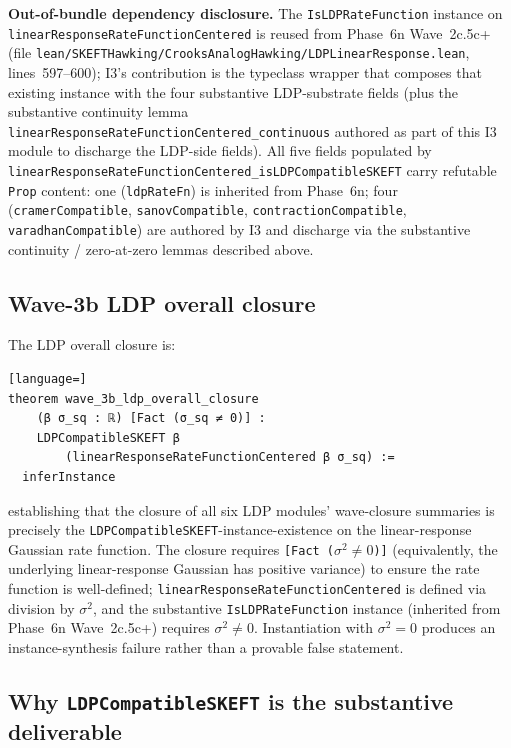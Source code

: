 \documentclass[11pt]{article}
\begin{document}
\textbf{Out-of-bundle dependency disclosure.} The
\texttt{IsLDPRateFunction} instance on
\texttt{linearResponseRateFunctionCentered} is reused from Phase~6n
Wave~2c.5c+ (file
\texttt{lean/SKEFTHawking/CrooksAnalogHawking/LDPLinearResponse.lean}, lines~597--600);
I3's contribution is the typeclass wrapper that composes that
existing instance with the four substantive LDP-substrate fields
(plus the substantive continuity lemma
\texttt{linearResponseRateFunctionCentered\_continuous} authored as
part of this I3 module to discharge the LDP-side fields). All five
fields populated by
\texttt{linearResponseRateFunctionCentered\_isLDPCompatibleSKEFT}
carry refutable \texttt{Prop} content: one (\texttt{ldpRateFn}) is
inherited from Phase~6n; four (\texttt{cramerCompatible},
\texttt{sanovCompatible}, \texttt{contractionCompatible},
\texttt{varadhanCompatible}) are authored by I3 and discharge via
the substantive continuity / zero-at-zero lemmas described above.

\subsection{Wave-3b LDP overall closure}

The LDP overall closure is:
\begin{lstlisting}[language=]
theorem wave_3b_ldp_overall_closure
    (β σ_sq : ℝ) [Fact (σ_sq ≠ 0)] :
    LDPCompatibleSKEFT β
        (linearResponseRateFunctionCentered β σ_sq) :=
  inferInstance
\end{lstlisting}

establishing that the closure of all six LDP modules' wave-closure
summaries is precisely the
\texttt{LDPCompatibleSKEFT}-instance-existence on the linear-response
Gaussian rate function. The closure requires
\texttt{[Fact ($\sigma^2 \neq 0$)]} (equivalently, the underlying
linear-response Gaussian has positive variance) to ensure the rate
function is well-defined; \texttt{linearResponseRateFunctionCentered}
is defined via division by $\sigma^2$, and the substantive
\texttt{IsLDPRateFunction} instance (inherited from Phase~6n
Wave~2c.5c+) requires $\sigma^2 \neq 0$. Instantiation with
$\sigma^2 = 0$ produces an instance-synthesis failure rather than a
provable false statement.

\subsection{Why \texttt{LDPCompatibleSKEFT} is the substantive deliverable}
\end{document}
